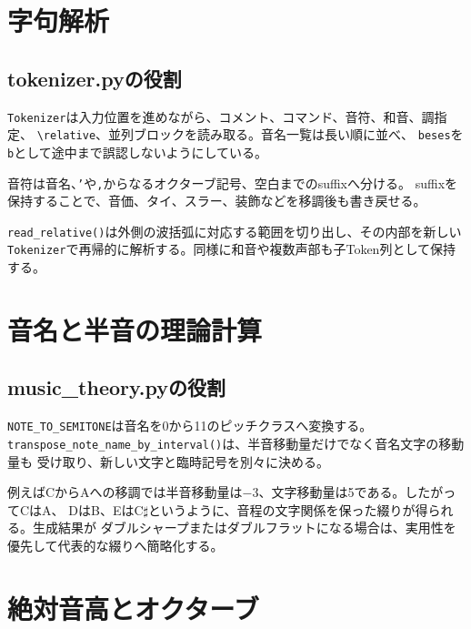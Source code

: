 \documentclass[uplatex,a4paper,11pt]{jsbook}
\begin{document}


\chapter{字句解析}

\section{tokenizer.pyの役割}

\texttt{Tokenizer}は入力位置を進めながら、コメント、コマンド、音符、和音、調指定、
\texttt{\textbackslash relative}、並列ブロックを読み取る。音名一覧は長い順に並べ、
\texttt{beses}を\texttt{b}として途中まで誤認しないようにしている。

音符は音名、\texttt{'}や\texttt{,}からなるオクターブ記号、空白までのsuffixへ分ける。
suffixを保持することで、音価、タイ、スラー、装飾などを移調後も書き戻せる。

\texttt{read\_relative()}は外側の波括弧に対応する範囲を切り出し、その内部を新しい
\texttt{Tokenizer}で再帰的に解析する。同様に和音や複数声部も子Token列として保持する。



\chapter{音名と半音の理論計算}

\section{music\_theory.pyの役割}

\texttt{NOTE\_TO\_SEMITONE}は音名を0から11のピッチクラスへ変換する。
\texttt{transpose\_note\_name\_by\_interval()}は、半音移動量だけでなく音名文字の移動量も
受け取り、新しい文字と臨時記号を別々に決める。

例えばCからAへの移調では半音移動量は\(-3\)、文字移動量は5である。したがってCはA、
DはB、EはC\(\sharp\)というように、音程の文字関係を保った綴りが得られる。生成結果が
ダブルシャープまたはダブルフラットになる場合は、実用性を優先して代表的な綴りへ簡略化する。



\chapter{絶対音高とオクターブ}
\end{document}
